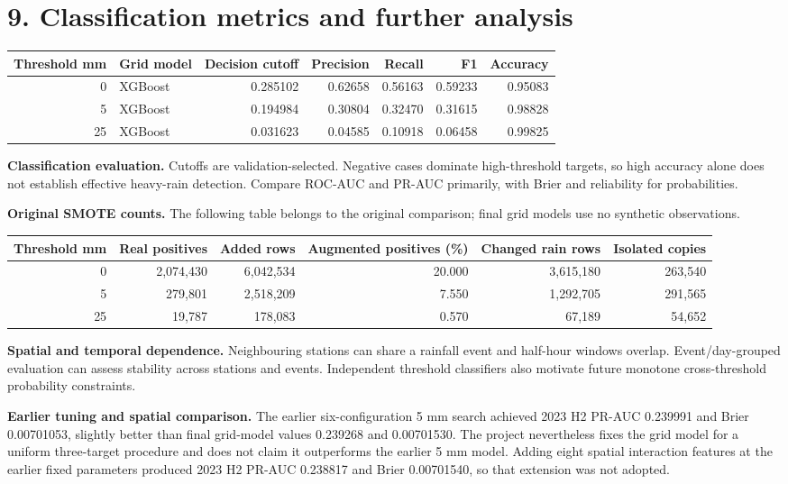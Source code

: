 \documentclass[UTF8,fontset=fandol,10pt,a4paper,landscape]{ctexart}
\begin{document}
\clearpage\section*{9. Classification metrics and further analysis}
\begin{center}\begin{tabular}{rlrrrrr}\toprule
Threshold mm & Grid model & Decision cutoff & Precision & Recall & F1 & Accuracy\\\midrule
0 & XGBoost & 0.285102 & 0.62658 & 0.56163 & 0.59233 & 0.95083\\
5 & XGBoost & 0.194984 & 0.30804 & 0.32470 & 0.31615 & 0.98828\\
25 & XGBoost & 0.031623 & 0.04585 & 0.10918 & 0.06458 & 0.99825\\
\bottomrule\end{tabular}\end{center}

\textbf{Classification evaluation.} Cutoffs are validation-selected. Negative cases dominate high-threshold targets, so high accuracy alone does not establish effective heavy-rain detection. Compare ROC-AUC and PR-AUC primarily, with Brier and reliability for probabilities.

\textbf{Original SMOTE counts.} The following table belongs to the original comparison; final grid models use no synthetic observations.

\begin{center}\begin{tabular}{rrrrrr}\toprule
Threshold mm & Real positives & Added rows & Augmented positives (\%) & Changed rain rows & Isolated copies\\\midrule
0 & 2,074,430 & 6,042,534 & 20.000 & 3,615,180 & 263,540\\
5 & 279,801 & 2,518,209 & 7.550 & 1,292,705 & 291,565\\
25 & 19,787 & 178,083 & 0.570 & 67,189 & 54,652\\
\bottomrule\end{tabular}\end{center}

\textbf{Spatial and temporal dependence.} Neighbouring stations can share a rainfall event and half-hour windows overlap. Event/day-grouped evaluation can assess stability across stations and events. Independent threshold classifiers also motivate future monotone cross-threshold probability constraints.

\textbf{Earlier tuning and spatial comparison.} The earlier six-configuration 5 mm search achieved 2023 H2 PR-AUC 0.239991 and Brier 0.00701053, slightly better than final grid-model values 0.239268 and 0.00701530. The project nevertheless fixes the grid model for a uniform three-target procedure and does not claim it outperforms the earlier 5 mm model. Adding eight spatial interaction features at the earlier fixed parameters produced 2023 H2 PR-AUC 0.238817 and Brier 0.00701540, so that extension was not adopted.
\end{document}
